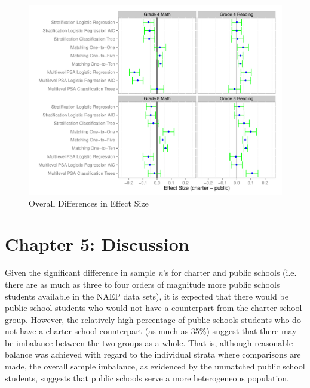 \documentclass[letterpaper,12p,twoside]{article} %
\begin{document}
{\begin{figure}[ht]
\begin{center}
\includegraphics[width=\textwidth]{../Figures2009/Overall.pdf}
\caption{Overall Differences in Effect Size}
\label{fig:overalldiff}
\end{center}
\end{figure}





\cleardoublepage
\section{Chapter 5: Discussion}


Given the significant difference in sample \textit{n}'s for charter and public schools (i.e. there are as much as three to four orders of magnitude more public schools students available in the NAEP data sets), it is expected that there would be public school students who would not have a counterpart from the charter school group. However, the relatively high percentage of public schools students who do not have a charter school counterpart (as much as 35\%) suggest that there may be imbalance between the two groups as a whole. That is, although reasonable balance was achieved with regard to the individual strata where comparisons are made, the overall sample imbalance, as evidenced by the unmatched public school students, suggests that public schools serve a more heterogeneous population.


\cleardoublepage



}
\end{document}
